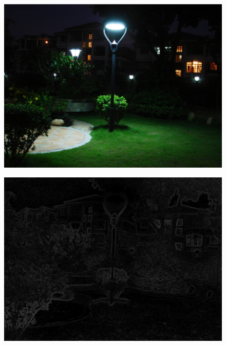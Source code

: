 \begin{figure}[t]
\centering
\begin{minipage}[b]{0.32\hsize}
\centering
\includegraphics[height=0.75\hsize]{images/noise/input.eps}
 \label{fig:weight_input}
\end{minipage}
\begin{minipage}[b]{0.32\hsize}
\centering
\includegraphics[height=0.75\hsize]{images/noise/MLV_10.eps}
 \label{fig:mlv_normal}
\end{minipage}
\begin{minipage}[b]{0.32\hsize}
\centering

\end{minipage}
\end{figure}
